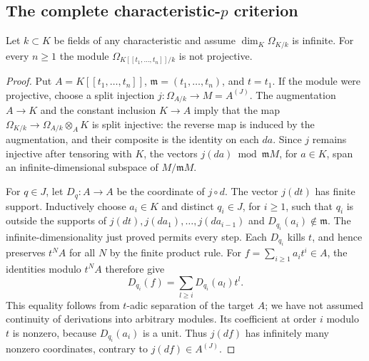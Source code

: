 \subsection{The complete characteristic-$p$ criterion}\label{subsec:A2}

\begin{lemma}\label{SA23-A-06}
Let $k\subset K$ be fields of any characteristic and assume
$\dim_K\Omega_{K/k}$ is infinite.  For every $n\geq1$ the module
$\Omega_{K[[t_1,\ldots,t_n]]/k}$ is not projective.
\end{lemma}
\begin{proof}
Put $A=K[[t_1,\ldots,t_n]]$, $\mathfrak m=(t_1,\ldots,t_n)$, and
$t=t_1$.  If the module were projective, choose a split injection
$j:\Omega_{A/k}\to M=A^{(J)}$.  The augmentation $A\to K$ and the
constant inclusion $K\to A$ imply that the map
$\Omega_{K/k}\to\Omega_{A/k}\otimes_AK$ is split injective: the
reverse map is induced by the augmentation, and their composite
is the identity on each $da$.  Since $j$ remains injective after
tensoring with $K$, the vectors $j(da)\bmod\mathfrak mM$, for
$a\in K$, span an infinite-dimensional subspace of $M/\mathfrak mM$.

For $q\in J$, let $D_q:A\to A$ be the coordinate of $j\circ d$.
The vector $j(dt)$ has finite support.  Inductively choose
$a_i\in K$ and distinct $q_i\in J$, for $i\geq1$, such that $q_i$
is outside the supports of $j(dt),j(da_1),\ldots,j(da_{i-1})$ and
$D_{q_i}(a_i)\notin\mathfrak m$.  The infinite-dimensionality just
proved permits every step.  Each $D_{q_i}$ kills $t$, and hence
preserves $t^NA$ for all $N$ by the finite product rule.
For $f=\sum_{i\geq1}a_it^i\in A$, the identities modulo $t^NA$
therefore give
\[
 D_{q_i}(f)=\sum_{l\geq i} D_{q_i}(a_l)t^l.
\]
This equality follows from $t$-adic separation of the target $A$;
we have not assumed continuity of derivations into arbitrary
modules.  Its coefficient at order $i$ modulo $t$ is nonzero,
because $D_{q_i}(a_i)$ is a unit.  Thus $j(df)$ has infinitely many
nonzero coordinates, contrary to $j(df)\in A^{(J)}$.
\end{proof}

